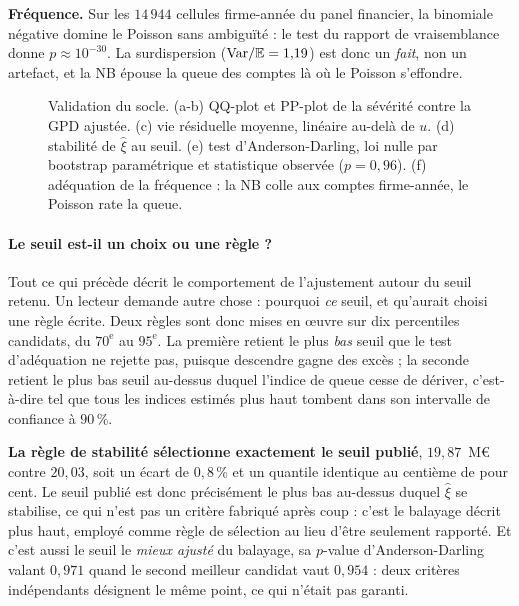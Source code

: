 \textbf{Fréquence.} Sur les $14\,944$ cellules firme-année du panel financier, la binomiale
négative domine le Poisson sans ambiguïté : le test du rapport de vraisemblance donne
$p\approx 10^{-30}$. La surdispersion ($\mathrm{Var}/\mathbb{E}=1{,}19$) est donc un \emph{fait}, non un
artefact, et la NB épouse la queue des comptes là où le Poisson s'effondre.

\begin{figure}[htbp]\centering
{}
\caption{Validation du socle. (a-b) QQ-plot et PP-plot de la sévérité contre la GPD
ajustée. (c) vie résiduelle moyenne, linéaire au-delà de $u$. (d) stabilité
de $\hat\xi$ au seuil. (e) test d'Anderson-Darling, loi nulle par bootstrap
paramétrique et statistique observée ($p=0{,}96$). (f) adéquation de la fréquence :
la NB colle aux comptes firme-année, le Poisson rate la queue.}
\label{soc:fig:validation}
\end{figure}

\paragraph{Le seuil est-il un choix ou une règle ?}
Tout ce qui précède décrit le comportement de l'ajustement autour du seuil retenu. Un lecteur
demande autre chose : pourquoi \emph{ce} seuil, et qu'aurait choisi une règle écrite. Deux règles
sont donc mises en \oe uvre sur dix percentiles candidats, du $70^{\text{e}}$ au $95^{\text{e}}$.
La première retient le plus \emph{bas} seuil que le test d'adéquation ne rejette pas, puisque
descendre gagne des excès ; la seconde retient le plus bas seuil au-dessus duquel l'indice de
queue cesse de dériver, c'est-à-dire tel que tous les indices estimés plus haut tombent dans son
intervalle de confiance à $90\,\%$.

\textbf{La règle de stabilité sélectionne exactement le seuil publié}, $19{,}87$~M\euro{} contre
$20{,}03$, soit un écart de $0{,}8\,\%$ et un quantile identique au centième de pour cent. Le
seuil publié est donc précisément le plus bas au-dessus duquel $\hat\xi$ se stabilise, ce qui
n'est pas un critère fabriqué après coup : c'est le balayage décrit plus haut, employé comme
règle de sélection au lieu d'être seulement rapporté. Et c'est aussi le seuil le \emph{mieux
ajusté} du balayage, sa $p$-value d'Anderson-Darling valant $0{,}971$ quand le second meilleur
candidat vaut $0{,}954$ : deux critères indépendants désignent le même point, ce qui n'était pas
garanti.

